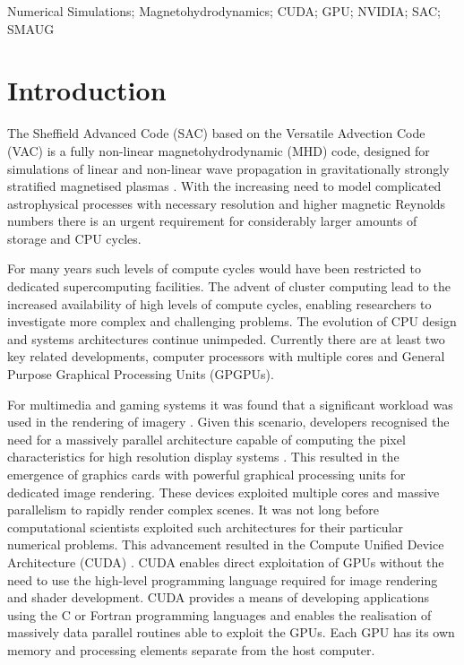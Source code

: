 \documentclass[final,1p]{elsarticle}
\begin{document}
\begin{keyword}
Numerical Simulations; Magnetohydrodynamics; CUDA; GPU; NVIDIA; SAC; SMAUG
\end{keyword}
\maketitle




\section{Introduction}
\setcounter{equation}{0}
The Sheffield Advanced Code (SAC) \cite{Shelyag2008} based on the Versatile Advection Code (VAC) \cite{Toth1998} is a fully non-linear magnetohydrodynamic (MHD) code, designed for simulations of linear and non-linear wave propagation in gravitationally strongly stratified magnetised plasmas \cite{Fedun2011a, Fedun2011b,Fedun2011c,Vigeesh2011,Scullion2011}. With the increasing need to model complicated astrophysical processes with necessary resolution and higher magnetic Reynolds numbers there is an urgent requirement for considerably larger amounts of storage and CPU cycles.

 For many years such levels of compute cycles would have been restricted to dedicated supercomputing facilities. The advent of cluster computing lead to the increased availability of high levels of compute cycles, enabling researchers to investigate more complex and challenging problems. The evolution of CPU design and systems architectures continue unimpeded. Currently there are at least two key related developments, computer processors with multiple cores and General Purpose Graphical Processing Units (GPGPUs).


For multimedia and gaming systems it was found that a significant workload was used in the rendering of imagery \cite{Lindholm2008}. Given this scenario, developers recognised the need for a massively parallel architecture capable of computing the pixel characteristics for high resolution display systems \cite{Kirk2010}. This resulted in the emergence of graphics cards with powerful graphical processing units for dedicated image rendering. These devices exploited multiple cores and massive parallelism to rapidly render complex scenes.  It was not long before computational scientists exploited such architectures for their particular numerical problems.  This advancement resulted in the Compute Unified Device Architecture (CUDA) \cite{Cook2012, Kirk2010b, Farber2011}. CUDA enables direct exploitation of GPUs without the need to use the high-level programming language required for image rendering and shader development. CUDA provides a means  of developing applications using the C or Fortran programming languages and enables the realisation of massively data parallel routines able to exploit the GPUs. Each GPU has its own memory and processing elements separate from the host computer.
\end{document}
